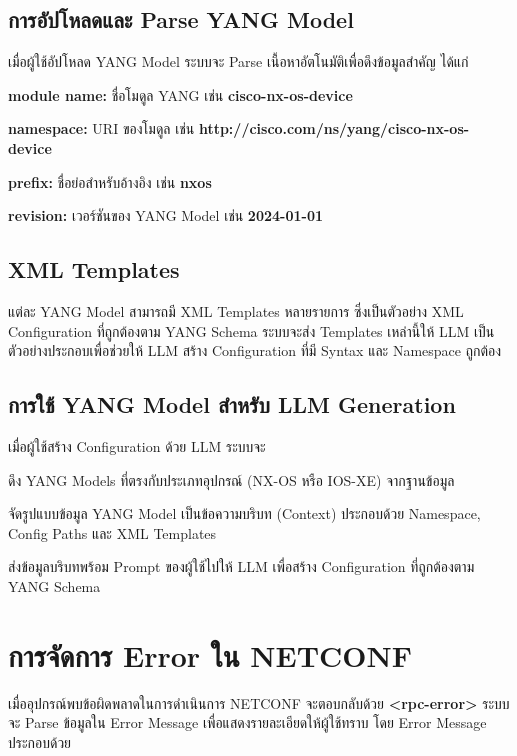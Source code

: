 \subsection{การอัปโหลดและ Parse YANG Model}
\hspace*{1.3em}
เมื่อผู้ใช้อัปโหลด YANG Model ระบบจะ Parse เนื้อหาอัตโนมัติเพื่อดึงข้อมูลสำคัญ ได้แก่

\begin{mycustomenum2}
    \item \textbf{module name:} ชื่อโมดูล YANG เช่น \textbf{cisco-nx-os-device}
    \item \textbf{namespace:} URI ของโมดูล เช่น \textbf{http://cisco.com/ns/yang/cisco-nx-os-device}
    \item \textbf{prefix:} ชื่อย่อสำหรับอ้างอิง เช่น \textbf{nxos}
    \item \textbf{revision:} เวอร์ชันของ YANG Model เช่น \textbf{2024-01-01}
\end{mycustomenum2}

\subsection{XML Templates}
\hspace*{1.3em}
แต่ละ YANG Model สามารถมี XML Templates หลายรายการ ซึ่งเป็นตัวอย่าง XML Configuration ที่ถูกต้องตาม YANG Schema ระบบจะส่ง Templates เหล่านี้ให้ LLM เป็นตัวอย่างประกอบเพื่อช่วยให้ LLM สร้าง Configuration ที่มี Syntax และ Namespace ถูกต้อง

\subsection{การใช้ YANG Model สำหรับ LLM Generation}
\hspace*{1.3em}
เมื่อผู้ใช้สร้าง Configuration ด้วย LLM ระบบจะ

\begin{mycustomenum2}
    \item ดึง YANG Models ที่ตรงกับประเภทอุปกรณ์ (NX-OS หรือ IOS-XE) จากฐานข้อมูล
    \item จัดรูปแบบข้อมูล YANG Model เป็นข้อความบริบท (Context) ประกอบด้วย Namespace, Config Paths และ XML Templates
    \item ส่งข้อมูลบริบทพร้อม Prompt ของผู้ใช้ไปให้ LLM เพื่อสร้าง Configuration ที่ถูกต้องตาม YANG Schema
\end{mycustomenum2}

\section{การจัดการ Error ใน NETCONF}
\hspace*{1.3em}
เมื่ออุปกรณ์พบข้อผิดพลาดในการดำเนินการ NETCONF จะตอบกลับด้วย \textbf{<rpc-error>} ระบบจะ Parse ข้อมูลใน Error Message เพื่อแสดงรายละเอียดให้ผู้ใช้ทราบ โดย Error Message ประกอบด้วย

